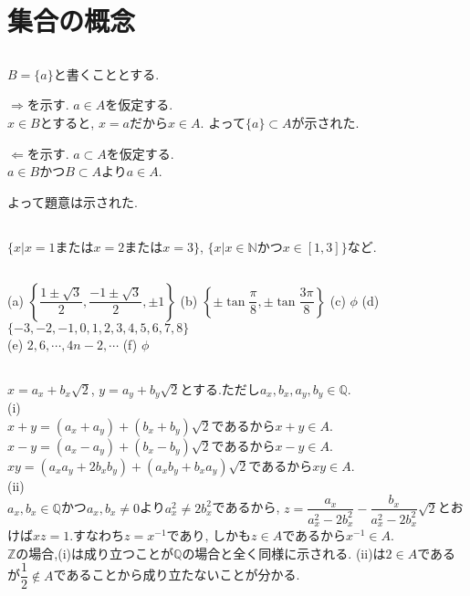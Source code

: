 \documentclass{jsarticle}
\begin{document}
\section{集合の概念}	%
\subsection{}	%
$B=\{a\}$と書くこととする.

$\Rightarrow$を示す. $a \in A$を仮定する.\\
$x \in B$とすると, $x = a$だから$x \in A$. よって$\{a\} \subset A$が示された.

$\Leftarrow$を示す. ${a} \subset A$を仮定する.\\
$a \in B$かつ$B \subset A$より$a \in A$.

よって題意は示された.

\subsection{}	%
$\{x| x = 1 またはx = 2 またはx = 3\}$, $\{x| x \in \mathbb{N} かつ x \in [1, 3]\}$など.

\subsection{}	%
\noindent
(a) $\left\{\dfrac{1 \pm \sqrt{3}}{2}, \dfrac{-1 \pm \sqrt{3}}{2}, \pm{1}\right\}$
(b) $\left\{\pm{\tan\dfrac{\pi}{8}}, \pm{\tan\dfrac{3\pi}{8}}\right\}$
(c) $\phi$
(d) $\{-3, -2, -1, 0, 1, 2, 3, 4, 5, 6, 7, 8\}$\\[1.5ex]
(e) ${2, 6, \cdots, 4n - 2, \cdots}$
(f) $\phi$

\subsection{}	%
$x = a_x + b_x\sqrt{2}$, $y = a_y + b_y\sqrt{2}$とする.ただし$a_x, b_x, a_y, b_y \in \mathbb{Q}$.\\
(i)\\
$x + y = (a_x + a_y) + (b_x + b_y)\sqrt{2}$であるから$x + y \in A$.\\
$x - y = (a_x - a_y) + (b_x - b_y)\sqrt{2}$であるから$x - y \in A$.\\
$xy = (a_x a_y + 2 b_x b_y) + (a_x b_y + b_x a_y)\sqrt{2}$であるから$xy \in A$.\\
(ii)\\
\indent
$a_x, b_x \in \mathbb{Q}$かつ$a_x, b_x \neq 0$より$a_x^2 \neq 2b_x^2$であるから, $z = \dfrac{a_x}{a_x^2 - 2b_x^2} - \dfrac{b_x}{a_x^2 - 2b_x^2}\sqrt{2}$とおけば$xz = 1$.すなわち$z = x^{-1}$であり, しかも$z \in A$であるから$x^{-1} \in A$.\\
$\mathbb{Z}$の場合,(i)は成り立つことが$\mathbb{Q}$の場合と全く同様に示される. (ii)は$2 \in A$であるが$\dfrac{1}{2} \notin A$であることから成り立たないことが分かる.
\end{document}
